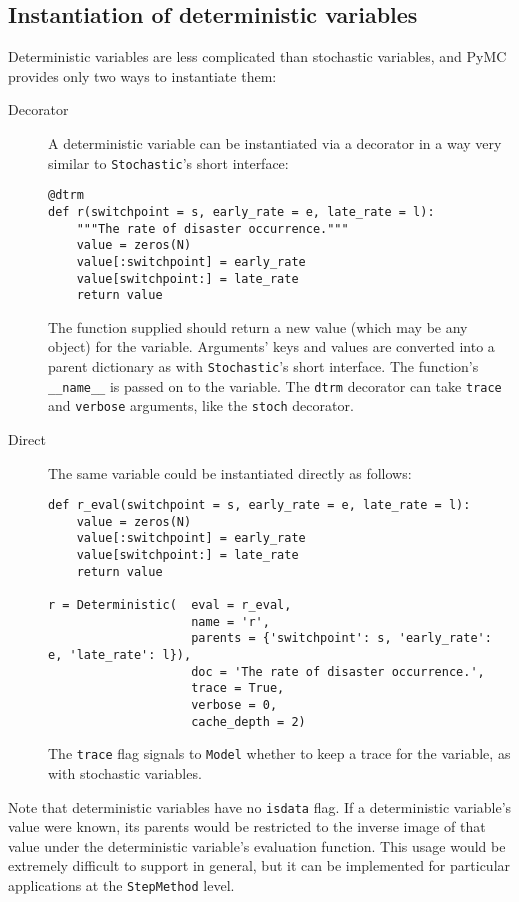 \subsection{Instantiation of deterministic variables}
Deterministic variables are less complicated than stochastic variables, and PyMC provides only two ways to instantiate them:
\begin{description}
    \item[Decorator] A deterministic variable can be instantiated via a decorator in a way very similar to \texttt{Stochastic}'s short interface:
\begin{verbatim}
@dtrm
def r(switchpoint = s, early_rate = e, late_rate = l):
    """The rate of disaster occurrence."""
    value = zeros(N)
    value[:switchpoint] = early_rate
    value[switchpoint:] = late_rate
    return value
\end{verbatim}
The function supplied should return a new value (which may be any object) for the variable. Arguments' keys and values are converted into a parent dictionary as with \texttt{Stochastic}'s short interface. The function's \texttt{__name__} is passed on to the variable. The \texttt{dtrm} decorator can take \texttt{trace} and \texttt{verbose} arguments, like the \texttt{stoch} decorator.
    \item[Direct] The same variable could be instantiated directly as follows:
\begin{verbatim}
def r_eval(switchpoint = s, early_rate = e, late_rate = l):
    value = zeros(N)
    value[:switchpoint] = early_rate
    value[switchpoint:] = late_rate
    return value

r = Deterministic(  eval = r_eval, 
                    name = 'r',
                    parents = {'switchpoint': s, 'early_rate': e, 'late_rate': l}),
                    doc = 'The rate of disaster occurrence.',
                    trace = True,
                    verbose = 0,
                    cache_depth = 2)
\end{verbatim}
The \texttt{trace} flag signals to \texttt{Model} whether to keep a trace for the variable, as with stochastic variables.
\end{description}

Note that deterministic variables have no \texttt{isdata} flag. If a deterministic variable's value were known, its parents would be restricted to the inverse image of that value under the deterministic variable's evaluation function. This usage would be extremely difficult to support in general, but it can be implemented for particular applications at the \texttt{StepMethod} level.

